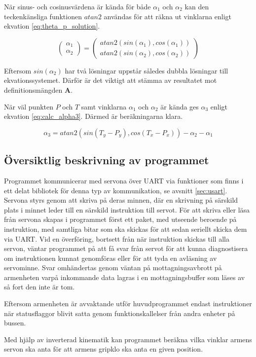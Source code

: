 När sinus- och cosinusvärdena är kända för både $\alpha_{1}$ och $\alpha_{2}$ kan den teckenkänsliga funktionen $atan2$ användas för att räkna ut vinklarna enligt ekvation \ref{eq:theta_p_solution}.

\begin{equation}
	\label{eq:theta_p_solution}
	\begin{pmatrix}
		\alpha_{1}\\
		\alpha_{2}
	\end{pmatrix}
	=
	\begin{pmatrix}
		atan2(sin(\alpha_{1}), cos(\alpha_{1}))\\
		atan2(sin(\alpha_{2}), cos(\alpha_{2}))
	\end{pmatrix}
\end{equation}

Eftersom $sin(\alpha_{2})$ har två lösningar uppstår således dubbla lösningar till ekvationssystemet. Därför är det viktigt att stämma av resultatet mot definitionsmängden $\mathbf{A}$.

När väl punkten $P$ och $T$ samt vinklarna $\alpha_{1}$ och $\alpha_{2}$ är kända ges $\alpha_{3}$ enligt ekvation \ref{eq:calc_alpha3}. Därmed är beräkningarna klara.

\begin{equation}
	\label{eq:calc_alpha3}
\alpha_{3} = atan2(sin(T_y - P_y), cos(T_x - P_x)) - \alpha_{2} - \alpha_{1}
\end{equation}

\subsection{Översiktlig beskrivning av programmet}

Programmet kommunicerar med servona över UART via funktioner som finns i ett delat bibliotek för denna typ av kommunikation, se avsnitt \ref{sec:usart}. Servona styrs genom att skriva på deras minnen, där en skrivning på särskild plats i minnet leder till en särskild instruktion till servot. För att skriva eller läsa från servona skapas i programmet först ett paket, med utseende beroende på instruktion, med samtliga bitar som ska skickas för att sedan seriellt skicka dem via UART. Vid en överföring, bortsett från när instruktion skickas till alla servon, väntar programmet på att få svar från servot för att kunna diagnostisera om instruktionen kunnat genomföras eller för att tyda en avläsning av servominne. Svar omhändertas genom väntan på mottagningsavbrott på armenheten varpå inkommande data lagras i en mottagningsbuffer som läses av så fort den inte är tom.

Eftersom armenheten är avvaktande utför huvudprogrammet endast instruktioner när statusflaggor blivit satta genom funktionskallelser från andra enheter på bussen. 

Med hjälp av inverterad kinematik kan programmet beräkna vilka vinklar armens servon ska anta för att armens gripklo ska anta en given position.
